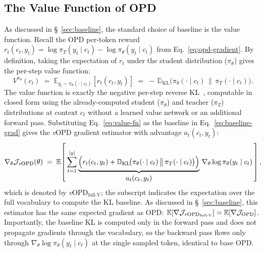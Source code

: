 \documentclass{article}
\newcommand{\method}{\emph{v}OPD}
\begin{document}
\subsection{The Value Function of OPD}
\label{sec:vopd_value}
As discussed in \S~\ref{sec:baseline}, the standard choice of baseline is the value function. Recall the OPD per-token reward $r_t(c_t, y_t) = \log \pi_T(y_t\mid c_t) - \log \pi_\theta(y_t\mid c_t)$ from Eq.~\eqref{eq:opd-gradient}. By definition, taking the expectation of $r_t$ under the student distribution ($\pi_\theta$) gives the per-step value function:
\begin{equation}
\label{eq:value-fn}
V^{\pi_\theta}(c_t)
\;=\;
\mathbb{E}_{y_t \sim \pi_\theta(\cdot\mid c_t)}[r_t(c_t, y_t)]
\;=\;
-\,\mathbb{D}_\mathrm{KL}\!\bigl(\pi_\theta(\cdot\mid c_t) \,\big\|\, \pi_T(\cdot\mid c_t)\bigr).
\end{equation}
The value function is exactly the negative per-step reverse KL~\citep{tang2025few}, computable in closed form using the already-computed student ($\pi_\theta$) and teacher ($\pi_T$) distributions at context $c_t$ without a learned value network or an additional forward pass. Substituting Eq.~\eqref{eq:value-fn} as the baseline in Eq.~\eqref{eq:baseline-grad} gives the \method{} gradient estimator with advantage $a_t(c_t, y_t)$:
\begin{equation}
\label{eq:vopd-full-grad}
\nabla_\theta \mathcal{J}_{\text{\method{}}}(\theta)
\;=\;
\mathbb{E}\!\left[\, \sum_{t=1}^{|y|}
\underbrace{\Bigl( r_t(c_t, y_t) + \mathbb{D}_\mathrm{KL}\!\bigl(\pi_\theta(\cdot\mid c_t) \,\big\|\, \pi_T(\cdot\mid c_t)\bigr) \Bigr)}_{\textstyle a_t(c_t,y_t)}
\,\nabla_\theta \log \pi_\theta(y_t\mid c_t) \,\right],
\end{equation}
which is denoted by \method$_{\text{full-V}}$; the subscript indicates the expectation over the full vocabulary to compute the KL baseline. As discussed in \S~\ref{sec:baseline}, this estimator has the same expected gradient as OPD: $\mathbb{E}[\nabla \mathcal{J}_{\text{\method}_{\text{full-V}}}] = \mathbb{E}[\nabla \mathcal{J}_\text{OPD}]$. Importantly, the baseline KL is computed only in the forward pass and does not propagate gradients through the vocabulary, so the backward pass flows only through $\nabla_\theta \log \pi_\theta(y_t\mid c_t)$ at the single sampled token, identical to base OPD.
\end{document}
